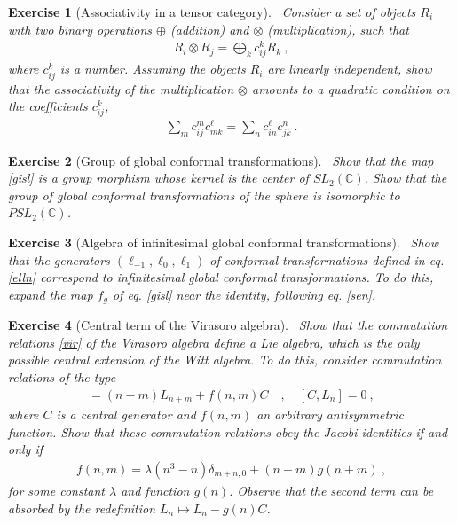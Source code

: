 \documentclass[12pt,a4paper,notitlepage]{report}
\numberwithin{equation}{section}
\theoremstyle{break}
\newtheorem{exo}{Exercise}[chapter]
\begin{document}
\begin{exo}[Associativity in a tensor category]
 ~\label{exoten}
Consider a set of objects $R_i$ with two binary operations $\oplus$ (addition) and $\otimes$ (multiplication), such that 
\begin{align}
 R_i \otimes R_j = \bigoplus_k c_{ij}^k R_k\ ,
\end{align}
where $c_{ij}^k$ is a number.
Assuming the objects $R_i$ are linearly independent, show that the associativity of the multiplication $\otimes$ amounts to a quadratic condition on the coefficients $c_{ij}^k$,
\begin{align}
 \sum_m c_{ij}^m c_{mk}^\ell = \sum_n c_{in}^\ell c_{jk}^n\ .
\end{align}
\end{exo}

\begin{exo}[Group of global conformal transformations]
 ~\label{exoiso}
Show that the map \eqref{gisl} is a group morphism whose kernel is the center of $SL_2({\mathbb{C}})$.
Show that the group of global conformal transformations of the sphere is isomorphic to $PSL_2({\mathbb{C}})$. 
\end{exo}

\begin{exo}[Algebra of infinitesimal global conformal transformations]
 ~\label{exomoz}
Show that the generators $(\ell_{-1},\ell_0,\ell_1)$ of conformal transformations defined in eq. \eqref{elln} correspond to infinitesimal global conformal transformations.
To do this, expand the map $f_g$ of eq. \eqref{gisl} near the identity, following eq. \eqref{sen}.
\end{exo}


\begin{exo}[Central term of the Virasoro algebra]
~\label{exovir}
 Show that the commutation relations \eqref{vir} of the Virasoro algebra define a Lie algebra, which is the only possible central extension of the Witt algebra.
To do this, consider commutation relations of the type
\begin{align}
 [L_n,L_m] =(n-m)L_{n+m} + f(n,m) C  \quad , \quad [C,L_n]=0\ ,
\end{align}
where $C$ is a central generator and $f(n,m)$ an arbitrary antisymmetric function.
Show that these commutation relations obey the Jacobi identities if and only if 
\begin{align}
 f(n,m) = \lambda (n^3-n)\delta_{m+n,0} + (n-m)g(n+m)\ ,
\end{align}
for some constant $\lambda$ and function $g(n)$.
Observe that the second term can be absorbed by the redefinition $L_n\mapsto L_n-g(n)C$.
\end{exo}
\end{document}
